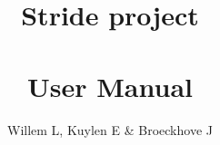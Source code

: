 \documentclass[a4paper,11pt]{report}
\title{Stride project \\ \\ User Manual}
\author{Willem L, Kuylen E \& Broeckhove J}
\begin{document}
\frontpages

\mainbodypages







%

\backpages
\end{document}
